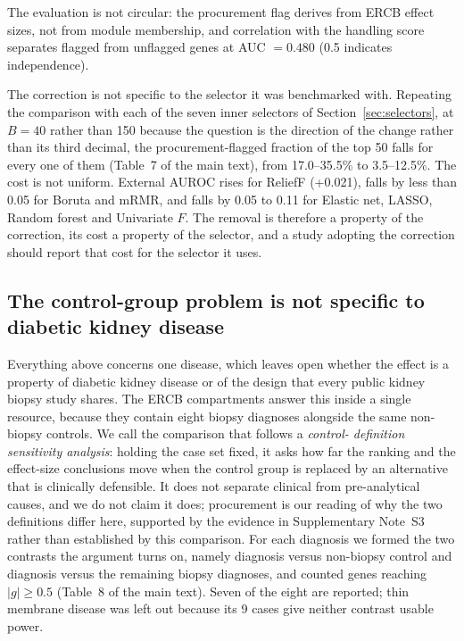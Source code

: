 \documentclass[11pt]{article}
\begin{document}
The evaluation is not circular: the procurement flag derives from ERCB effect sizes, not from
module membership, and correlation with the handling score separates flagged from unflagged genes
at AUC $= 0.480$ (0.5 indicates independence).

The correction is not specific to the selector it was benchmarked with. Repeating the comparison with each of the seven inner selectors of Section~\ref{sec:selectors}, at $B = 40$ rather than 150 because the question is the direction of the change rather than its third decimal, the procurement-flagged fraction of the top 50 falls for every one of them (Table~7 of the main text), from 17.0--35.5\% to 3.5--12.5\%. The cost is not uniform. External AUROC rises for ReliefF (+0.021), falls by less than 0.05 for Boruta and mRMR, and falls by 0.05 to 0.11 for Elastic net, LASSO, Random forest and Univariate $F$. The removal is therefore a property of the correction, its cost a property of the selector, and a study adopting the correction should report that cost for the selector it uses.




\label{note:S6}
\subsection{The control-group problem is not specific to diabetic kidney
disease}\label{sec:external}

Everything above concerns one disease, which leaves open whether the effect is a property of
diabetic kidney disease or of the design that every public kidney biopsy study shares. The ERCB
compartments answer this inside a single resource, because they contain eight biopsy diagnoses
alongside the same non-biopsy controls. We call the comparison that follows a \emph{control-
definition sensitivity analysis}: holding the case set fixed, it asks how far the ranking and
the effect-size conclusions move when the control group is replaced by an alternative that is
clinically defensible. It does not separate clinical from pre-analytical causes, and we do not
claim it does; procurement is our reading of why the two definitions differ here, supported
by the evidence in Supplementary Note~S3 rather than established by this comparison. For each diagnosis we formed the two contrasts the
argument turns on, namely diagnosis versus non-biopsy control and diagnosis versus the
remaining biopsy diagnoses, and counted genes reaching $|g| \ge 0.5$ (Table~8 of the main text). Seven of the
eight are reported; thin membrane disease was left out because its 9 cases give neither
contrast usable power.
\end{document}
